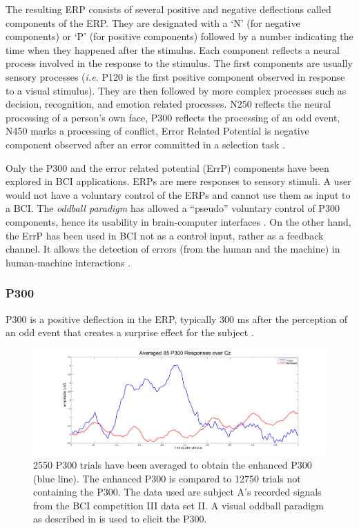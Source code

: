 The resulting ERP consists of several positive and negative deflections called components of the ERP.
They are designated with a `N' (for negative components) or `P' (for positive components) followed by a number indicating the time when they happened after the stimulus.
Each component reflects a neural process involved in the response to the stimulus.
The first components are usually sensory processes (\textit{i.e.} P120 is the first positive component observed in response to a visual stimulus).
They are then followed by more complex processes such as decision, recognition, and emotion related processes. 
N250 reflects the neural processing of a person's own face, P300 reflects the processing of an odd event, N450 marks a processing of conflict, Error Related Potential is negative component observed after an error committed in a selection task \citep{luck_introduction_2014}. 

Only the P300 \citep{polich_updating_2007, donchin_surprise!_1981} and the error related potential (ErrP) \citep{miltner_event-related_1997} components have been explored in BCI applications. 
ERPs are mere responses to sensory stimuli. 
A user would not have a voluntary control of the ERPs and cannot use them as input to a BCI.
The \emph{oddball paradigm} has allowed a ``pseudo'' voluntary control of P300 components, hence its usability in brain-computer interfaces \citep{ritter_averaged_1969}. 
On the other hand, the ErrP has been used in BCI not as a control input, rather as a feedback channel. 
It allows the detection of errors (from the human and the machine) in human-machine interactions \citep{margaux_objective_2012}.   

\subsubsection{P300}
\label{subsubsec:p300}

P300 is a positive deflection in the ERP, typically 300 ms after the perception of an odd event that creates a surprise effect for the subject \citep{donchin_surprise!_1981}.
\begin{figure}[!ht]
    \centering
    \includegraphics[width=0.5\columnwidth]{Figures/Averaged-85-P300-Responses-over-Cz.pdf}
    \caption{\footnotesize{2550 P300 trials have been averaged to obtain the enhanced P300 (blue line).
    The enhanced P300 is compared to 12750 trials not containing the P300.
    The data used are subject A's recorded signals from the BCI competition III data set II.
    A visual oddball paradigm as described in \citep{donchin_mental_2000} is used to elicit the P300.}}
    \label{fig:85_P300}
\end{figure}
\par

